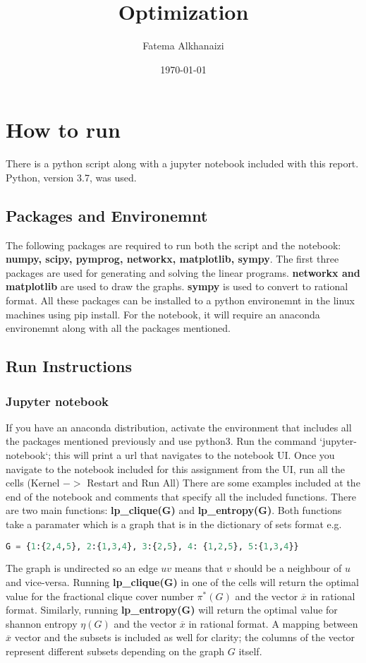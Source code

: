 \documentclass[11pt]{article}
\title{Optimization}
\author{Fatema Alkhanaizi}
\date{\today}
\begin{document}
    \maketitle
    \section*{How to run}
    There is a python script along with a jupyter notebook included with this report. Python, version 3.7, was used. 
    \subsection*{Packages and Environemnt}
    The following packages are required to run both the script and the notebook: \textbf{numpy, scipy, pymprog, networkx, matplotlib, sympy}. The first three packages are used for generating and solving the linear programs. \textbf{networkx and matplotlib} are used to draw the graphs. \textbf{sympy} is used to convert to rational format.   
    All these packages can be installed to a python environemnt in the linux machines using pip install. For the notebook, it will require an anaconda environemnt along with all the packages mentioned. 
    \subsection*{Run Instructions}
    \subsubsection*{Jupyter notebook}
    If you have an anaconda distribution, activate the environment that includes all the packages mentioned previously and use python3. Run the command `jupyter-notebook`; this will print a url that navigates to the notebook UI. Once you navigate to the notebook included for this assignment from the UI, run all the cells (Kernel $->$ Restart and Run All) There are some examples included at the end of the notebook and comments that specify all the included functions. There are two main functions: \textbf{lp\_clique(G)} and \textbf{lp\_entropy(G)}. Both functions take a paramater which is a graph that is in the dictionary of sets format e.g. 
    \begin{lstlisting}[language=Python]
        G = {1:{2,4,5}, 2:{1,3,4}, 3:{2,5}, 4: {1,2,5}, 5:{1,3,4}}
    \end{lstlisting}
    The graph is undirected so an edge $uv$ means that $v$ should be a neighbour of $u$ and vice-versa. 
    Running \textbf{lp\_clique(G)} in one of the cells will return the optimal value for the fractional clique cover number $\pi^*(G)$ and the vector $\overline{x}$ in rational format. Similarly, running \textbf{lp\_entropy(G)} will return the optimal value for shannon entropy $\eta(G)$ and the vector $\overline{x}$ in rational format. A mapping between $\overline{x}$ vector and the subsets is included as well for clarity; the columns of the vector represent different subsets depending on the graph $G$ itself.  
\end{document}
